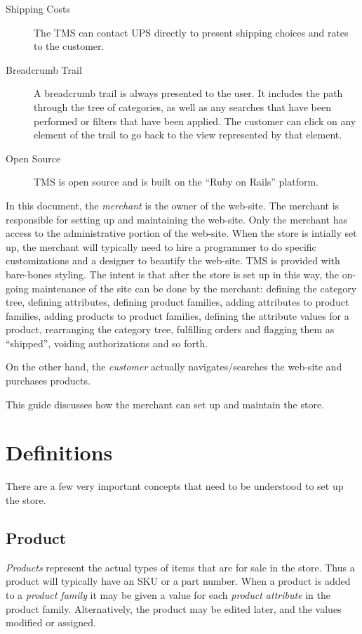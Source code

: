 \documentclass[letterpaper, 12pt]{article}
\begin{document}
\begin{description}
\item[Shipping Costs] The TMS can contact UPS directly to present shipping choices and rates to the customer.
\item[Breadcrumb Trail] A breadcrumb trail is always presented to the user.  It includes the path through the tree of categories, as well as any searches that have been performed or filters that have been applied.  The customer can click on any element of the trail to go back to the view represented by that element.
\item[Open Source] TMS is open source and is built on the ``Ruby on Rails'' platform.
\end{description}

In this document, the {\em merchant} is the owner of the web-site.  The merchant is responsible for setting up and maintaining the web-site.  Only the merchant has access to the administrative portion of the web-site.  When the store is intially set up, the merchant will typically need to hire a programmer to do specific customizations and a designer to beautify the web-site.  TMS is provided with bare-bones styling.  The intent is that after the store is set up in this way,  the on-going maintenance of the site can be done by the merchant: defining the category tree,
defining attributes, defining product families, adding attributes to product families,  adding products to product families, defining the attribute values for a product, rearranging the category tree, fulfilling orders and flagging them as ``shipped'', voiding authorizations and so forth. 

On the other hand, the {\em customer} actually navigates/searches the web-site and purchases products. 

This guide discusses how the merchant can set up and maintain the store.

\section{Definitions}
There are a few very important concepts that need to be understood to set up the store.

\subsection{Product}
{\em Products} represent the actual types of items that are for sale in the store.  Thus a product will typically have an SKU or a part number.
When a product is added to a {\em product family} it may be given a value for each {\em product attribute} in the product family.  Alternatively,
the product may be edited later, and the values modified or assigned.
\end{document}
